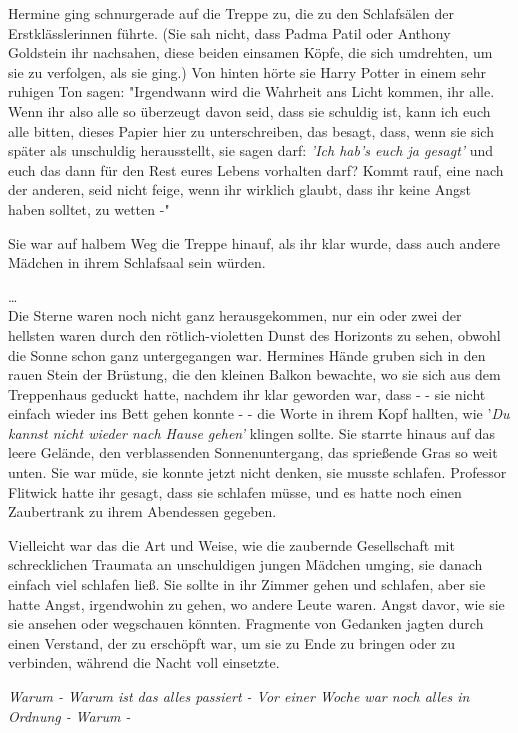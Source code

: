 {Hermine ging schnurgerade auf die Treppe zu, die zu den Schlafsälen der Erstklässlerinnen führte. (Sie sah nicht, dass Padma Patil oder Anthony Goldstein ihr nachsahen, diese beiden einsamen Köpfe, die sich umdrehten, um sie zu verfolgen, als sie ging.) Von hinten hörte sie Harry Potter in einem sehr ruhigen Ton sagen: "Irgendwann wird die Wahrheit ans Licht kommen, ihr alle. Wenn ihr also alle so überzeugt davon seid, dass sie schuldig ist, kann ich euch alle bitten, dieses Papier hier zu unterschreiben, das besagt, dass, wenn sie sich später als unschuldig herausstellt, sie sagen darf: \emph{'Ich hab's euch ja gesagt'} und euch das dann für den Rest eures Lebens vorhalten darf? Kommt rauf, eine nach der anderen, seid nicht feige, wenn ihr wirklich glaubt, dass ihr keine Angst haben solltet, zu wetten -"

Sie war auf halbem Weg die Treppe hinauf, als ihr klar wurde, dass auch andere Mädchen in ihrem Schlafsaal sein würden.

…\\ Die Sterne waren noch nicht ganz herausgekommen, nur ein oder zwei der hellsten waren durch den rötlich-violetten Dunst des Horizonts zu sehen, obwohl die Sonne schon ganz untergegangen war. Hermines Hände gruben sich in den rauen Stein der Brüstung, die den kleinen Balkon bewachte, wo sie sich aus dem Treppenhaus geduckt hatte, nachdem ihr klar geworden war, dass - - sie nicht einfach wieder ins Bett gehen konnte - - die Worte in ihrem Kopf hallten, wie '\emph{Du kannst nicht wieder nach Hause gehen'} klingen sollte. Sie starrte hinaus auf das leere Gelände, den verblassenden Sonnenuntergang, das sprießende Gras so weit unten. Sie war müde, sie konnte jetzt nicht denken, sie musste schlafen. Professor Flitwick hatte ihr gesagt, dass sie schlafen müsse, und es hatte noch einen Zaubertrank zu ihrem Abendessen gegeben.

Vielleicht war das die Art und Weise, wie die zaubernde Gesellschaft mit schrecklichen Traumata an unschuldigen jungen Mädchen umging, sie danach einfach viel schlafen ließ. Sie sollte in ihr Zimmer gehen und schlafen, aber sie hatte Angst, irgendwohin zu gehen, wo andere Leute waren. Angst davor, wie sie sie ansehen oder wegschauen könnten. Fragmente von Gedanken jagten durch einen Verstand, der zu erschöpft war, um sie zu Ende zu bringen oder zu verbinden, während die Nacht voll einsetzte.

\emph{Warum - Warum ist das alles passiert - Vor einer Woche war noch alles in Ordnung -} \emph{Warum -}

}
